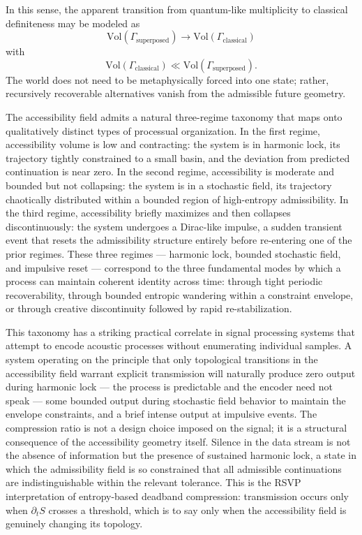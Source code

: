 \documentclass[12pt,a4paper]{article}
\begin{document}
In this sense, the apparent transition from quantum-like multiplicity to classical definiteness may be modeled as
\[
\mathrm{Vol}(\Gamma_{\mathrm{superposed}}) \to \mathrm{Vol}(\Gamma_{\mathrm{classical}})
\]
with
\[
\mathrm{Vol}(\Gamma_{\mathrm{classical}})
\ll
\mathrm{Vol}(\Gamma_{\mathrm{superposed}}).
\]
The world does not need to be metaphysically forced into one state; rather, recursively recoverable alternatives vanish from the admissible future geometry.

The accessibility field admits a natural three-regime taxonomy that maps onto qualitatively distinct types of processual organization. In the first regime, accessibility volume is low and contracting: the system is in harmonic lock, its trajectory tightly constrained to a small basin, and the deviation from predicted continuation is near zero. In the second regime, accessibility is moderate and bounded but not collapsing: the system is in a stochastic field, its trajectory chaotically distributed within a bounded region of high-entropy admissibility. In the third regime, accessibility briefly maximizes and then collapses discontinuously: the system undergoes a Dirac-like impulse, a sudden transient event that resets the admissibility structure entirely before re-entering one of the prior regimes. These three regimes — harmonic lock, bounded stochastic field, and impulsive reset — correspond to the three fundamental modes by which a process can maintain coherent identity across time: through tight periodic recoverability, through bounded entropic wandering within a constraint envelope, or through creative discontinuity followed by rapid re-stabilization.

This taxonomy has a striking practical correlate in signal processing systems that attempt to encode acoustic processes without enumerating individual samples. A system operating on the principle that only topological transitions in the accessibility field warrant explicit transmission will naturally produce zero output during harmonic lock — the process is predictable and the encoder need not speak — some bounded output during stochastic field behavior to maintain the envelope constraints, and a brief intense output at impulsive events. The compression ratio is not a design choice imposed on the signal; it is a structural consequence of the accessibility geometry itself. Silence in the data stream is not the absence of information but the presence of sustained harmonic lock, a state in which the admissibility field is so constrained that all admissible continuations are indistinguishable within the relevant tolerance. This is the RSVP interpretation of entropy-based deadband compression: transmission occurs only when \(\partial_t S\) crosses a threshold, which is to say only when the accessibility field is genuinely changing its topology.
\end{document}
